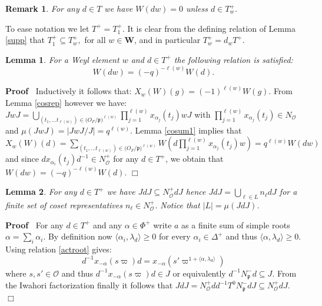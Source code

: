 \documentclass{article}
\newenvironment{proof}{\noindent\textbf{Proof\ }}{\hspace*{\fill}$\Box$\medskip}
\newtheorem{lemma}{Lemma}
\newtheorem{remark}{Remark}
\begin{document}
\begin{remark}
  For any $d\in T$ we have $W(dw)=0$ unless $d\in T_w^+$.
\end{remark}


 To ease notation we let $T^+=T_1^+$. It is clear from the defining relation of Lemma \ref{supp} that $T_1^+\subseteq T_w^+,$ for all $ w\in\mathbf{W}$, and in particular $T_w^+=d_wT^+$. 



\begin{lemma} \label{permlem}
         For a Weyl element $w$ and $d\in T^+$ the following relation is satisfied:
 $$W(dw)=(-q)^{-\ell(w)}W(d).$$
\end{lemma}
\begin{proof}
Inductively it follows that: $X_{w}(W)(g)=(-1)^{\ell(w)}W(g)$.
From Lemma \ref{cosrep} however we have: $JwJ=\underset{(t_1,\dots t_{\ell(w)})\in \mathcal({O}_F/\mathfrak{p})^{\ell(w)}}{\bigcup}\prod\limits_{j=1}^{\ell(w)}x_{\alpha_j}(t_{j})wJ$ with $\prod\limits_{j=1}^{\ell(w)}x_{\alpha_j}(t_j)\in N_{\mathcal{O}}$ and $\mu(JwJ)=|JwJ/J|=q^{\ell(w)}$. Lemma \ref{cosum1} implies that  $X_{w}(W)(d)=\sum\limits_{(t_1,\dots t_{\ell(w)})\in \mathcal({O}_F/\mathfrak{p})^{\ell(w)}}W(d\prod\limits_{j=1}^{\ell(w)}x_{\alpha_j}(t_j)w)=q^{\ell(w)}W(dw)$ and since $dx_{\alpha_i}(t_j)d^{-1}\in N_{\mathcal{O}}^+$ for any $d\in T^+$, we obtain that $W(dw)=(-q)^{-\ell(w)}W(d)$.
\end{proof}
\begin{lemma} \label{dreps}
    For any $d\in T^+$ we have $JdJ\subseteq  N_{\mathcal{O}}^+dJ$ hence $JdJ=\bigcup\limits_{\ell\in L}n_{\ell}dJ$ for a finite set of coset representatives $n_{\ell}\in N_{\mathcal{O}}^{+}$. Notice that $|L|=\mu(JdJ)$.
\end{lemma}
\begin{proof}
    For any $d\in T^+$ and any $\alpha\in\Phi^+$ write $a$ as a finite sum of simple roots $\alpha=\sum\limits_{i}\alpha_i$. By definition now $\langle\alpha_i,\lambda_d\rangle\geq 0$ for every $\alpha_i\in\Delta^+$ and thus $\langle\alpha,\lambda_d\rangle\geq 0$. Using relation \eqref{actroot} gives: $$d^{-1}x_{-\alpha}(s\varpi)d=x_{-\alpha}(s'\varpi^{1+\langle\alpha,\lambda_d\rangle})$$ where $s,s'\in\mathcal{O}$ and thus $d^{-1}x_{-\alpha}(s\varpi)d\in J$ or equivalently $d^{-1}N_{\mathfrak{p}}^-d\subseteq J$. From the Iwahori factorization finally it follows that $JdJ=N_{\mathcal{O}}^+dd^{-1}T^0N_{\mathfrak{p}}^-dJ\subseteq N_{\mathcal{O}}^+dJ$.
\end{proof} 
\end{document}
